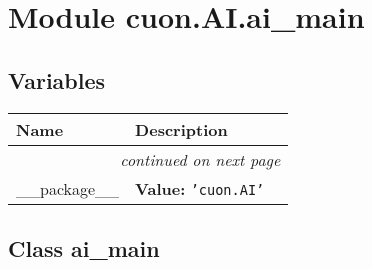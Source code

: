%
%
%


\section{Module cuon.AI.ai\_main}

    \label{cuon:AI:ai_main}


  \subsection{Variables}

    \vspace{-1cm}
\hspace{\varindent}\begin{longtable}{|p{\varnamewidth}|p{\vardescrwidth}|l}
\cline{1-2}
\cline{1-2} \centering \textbf{Name} & \centering \textbf{Description}& \\
\cline{1-2}
\endhead\cline{1-2}\multicolumn{3}{r}{\small\textit{continued on next page}}\\\endfoot\cline{1-2}
\endlastfoot\raggedright \_\-\_\-p\-a\-c\-k\-a\-g\-e\-\_\-\_\- & \raggedright \textbf{Value:} 
{\tt \texttt{'}\texttt{cuon.AI}\texttt{'}}&\\
\cline{1-2}
\end{longtable}



\subsection{Class ai\_main}

